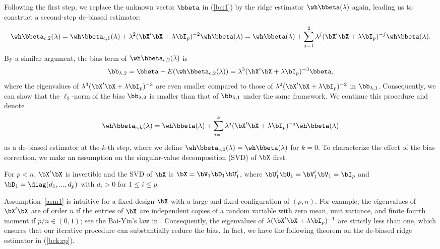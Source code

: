 Following the first step, we replace the unknown vector $\bbeta$ in (\ref{bc:1}) by the ridge estimator $\wh\bbeta(\lambda)$ again, leading us to construct a second-step de-biased estimator:
\begin{equation}\label{bc2:rp}
    \wh\bbeta_{c,2}(\lambda)=\wh\bbeta_{c,1}(\lambda)+\lambda^2(\bX'\bX+\lambda\bI_p)^{-2}\wh\bbeta(\lambda)=\wh\bbeta(\lambda)+\sum_{j=1}^2\lambda^j(\bX'\bX+\lambda\bI_p)^{-j}\wh\bbeta(\lambda).
\end{equation}
By a similar argument, the bias term of $\wh\bbeta_{c,2}(\lambda)$ is
\begin{equation}\label{bc:2}
    \bb_{\lambda,2}=\bbeta-E(\wh\bbeta_{c,2}(\lambda))=\lambda^3(\bX'\bX+\lambda\bI_p)^{-3}\bbeta,
\end{equation}
where the eigenvalues of $\lambda^3(\bX'\bX+\lambda\bI_p)^{-3}$ are even smaller compared to those of $\lambda^2(\bX'\bX+\lambda\bI_p)^{-2}$ in $\bb_{\lambda,1}$. Consequently, we can  show that the $\ell_2$-norm of the bias $\bb_{\lambda,2}$ is smaller than that of $\bb_{\lambda,1}$ under the same framework. We  continue this procedure and denote
\begin{equation}\label{bck:rp}
    \wh\bbeta_{c,k}(\lambda)=\wh\bbeta(\lambda)+\sum_{j=1}^k\lambda^j(\bX'\bX+\lambda\bI_p)^{-j}\wh\bbeta(\lambda)
\end{equation}
as a de-biased estimator at the $k$-th step, where we define $\wh\bbeta_{c,0}(\lambda)=\wh\bbeta(\lambda)$ for $k=0$. To characterize the effect of the bias correction, we make an assumption on the singular-value decomposition (SVD) of $\bX$ first.
\begin{assumption}\label{asm1}
    For $p< n$, $\bX'\bX$ is invertible and the SVD of $\bX$ is $\bX=\bV_1\bD_1\bU_1'$, where $\bU_1'\bU_1=\bV_1'\bV_1=\bI_p$ and $\bD_1=\diag(d_1,...,d_p)$ with $d_i>0$ for $1\leq i\leq p$.
    \end{assumption}
Assumption~\ref{asm1} is intuitive for a fixed design $\bX$ with a large and fixed configuration of $(p,n)$. For example, the eigenvalues of $\bX'\bX$ are of order $n$ if the entries of $\bX$  are independent copies of a random variable with zero mean, unit variance, and
finite fourth moment if $p/n\in (0,1)$; see the Bai-Yin's law in \cite{bai1993limit}.  Consequently, the eigenvalues of $\lambda(\bX'\bX+\lambda\bI_p)^{-1}$ are strictly less than one, which ensures that our iterative procedure can substantially reduce the bias. 
In fact, we have the following theorem on the de-biased ridge estimator in (\ref{bck:rp}).
